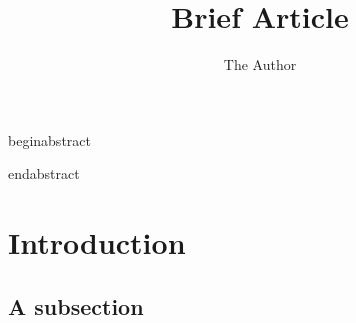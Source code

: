 \documentclass[11pt]{article} %
\title{Brief Article}
\author{The Author}
\begin{document}
\maketitle

begin{abstract}

end{abstract}

\section{Introduction}



\subsection{A subsection}







\begin{thebibliography}{50}

\end{thebibliography}
\end{document}
